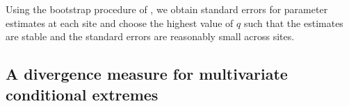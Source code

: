 \documentclass[12pt,compact]{article}
\begin{document}
Using the bootstrap procedure of \citet{Heffernan2004}, we obtain standard errors for parameter estimates at each site and choose the highest value of $q$ such that the estimates are stable and the standard errors are reasonably small across sites. %

\subsection{A divergence measure for multivariate conditional extremes}
\label{subsec:div}
\end{document}
